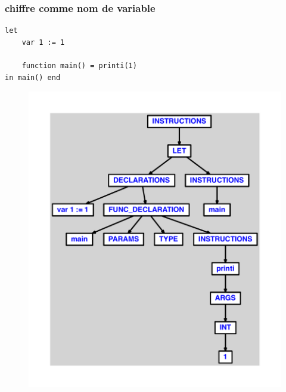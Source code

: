 \documentclass{article}
\begin{document}
\subsubsection{chiffre comme nom de variable}
\begin{lstlisting}
let
	var 1 := 1

	function main() = printi(1)
in main() end
\end{lstlisting}
\newpage
\begin{figure}[H]
\centering
\includegraphics[max width=\textwidth]{ast/ast_301.pdf}
\end{figure}
\newpage
\end{document}
